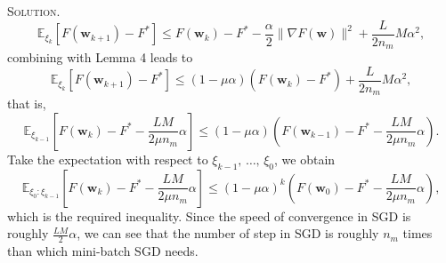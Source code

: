 \documentclass[12pt, a4paper, oneside]{ctexart}
\newenvironment{solution}{\par\noindent\textsc{Solution. }}{\\\par}
\begin{document}
\begin{solution}
	\[
	\mathbb{E}_{\xi_k}[F(\mathbf{w}_{k + 1}) - F^*] \leq F(\mathbf{w}_k) - F^* - \frac{\alpha}{2}\|\nabla F(\mathbf{w})\|^2 + \frac{L}{2n_m}M\alpha^2,
	\]
	combining with Lemma 4 leads to
	\[
	\mathbb{E}_{\xi_k}[F(\mathbf{w}_{k + 1}) - F^*] \leq (1 - \mu\alpha)(F(\mathbf{w}_k) - F^*) + \frac{L}{2n_m}M\alpha^2,
	\]
	that is,
	\[
	\mathbb{E}_{\xi_{k-1}}[F(\mathbf{w}_k) - F^* - \frac{LM}{2\mu n_m}\alpha] \leq (1 - \mu\alpha)(F(\mathbf{w}_{k-1}) - F^* - \frac{LM}{2\mu n_m}\alpha).
	\]
	Take the expectation with respect to $\xi_{k-1},\, \dots,\, \xi_0$, we obtain
	\[
	\mathbb{E}_{\xi_0:\xi_{k-1}}[F(\mathbf{w}_k) - F^* - \frac{LM}{2\mu n_m}\alpha] \leq (1 - \mu\alpha)^k(F(\mathbf{w}_0) - F^* - \frac{LM}{2\mu n_m}\alpha),
	\]
	which is the required inequality. \newline
	Since the speed of convergence in SGD is roughly $\frac{LM}{2}\alpha$, we can see that the number of step in SGD is roughly $n_m$ times than which mini-batch SGD needs.
\end{solution}
\end{document}
